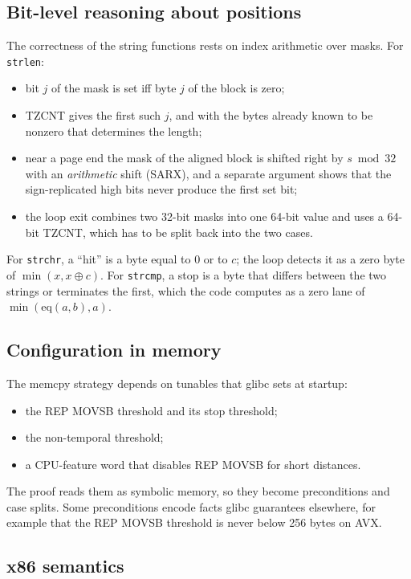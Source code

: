 \documentclass[11pt]{article}
\newcommand{\code}[1]{\texttt{#1}}
\begin{document}
\subsection{Bit-level reasoning about positions}

The correctness of the string functions rests on index arithmetic over
masks.  For \code{strlen}:
\begin{itemize}[nosep]
\item bit $j$ of the mask is set iff byte $j$ of the block is zero;
\item TZCNT gives the first such $j$, and with the bytes already known to be
      nonzero that determines the length;
\item near a page end the mask of the aligned block is shifted right by
      $s \bmod 32$ with an \emph{arithmetic} shift (SARX), and a separate
      argument shows that the sign-replicated high bits never produce the
      first set bit;
\item the loop exit combines two 32-bit masks into one 64-bit value and uses
      a 64-bit TZCNT, which has to be split back into the two cases.
\end{itemize}
For \code{strchr}, a ``hit'' is a byte equal to 0 or to $c$; the loop
detects it as a zero byte of $\min(x, x \oplus c)$.  For \code{strcmp}, a
stop is a byte that differs between the two strings or terminates the first,
which the code computes as a zero lane of $\min(\mathrm{eq}(a,b), a)$.

\subsection{Configuration in memory}

The memcpy strategy depends on tunables that glibc sets at startup:
\begin{itemize}[nosep]
\item the REP MOVSB threshold and its stop threshold;
\item the non-temporal threshold;
\item a CPU-feature word that disables REP MOVSB for short distances.
\end{itemize}
The proof reads them as symbolic memory, so they become preconditions and
case splits.  Some preconditions encode facts glibc guarantees elsewhere,
for example that the REP MOVSB threshold is never below 256 bytes on AVX.

\subsection{x86 semantics}
\end{document}
